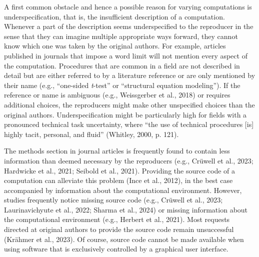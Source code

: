 \documentclass[authordate, empirical]{jote-new-article}
\begin{document}
	A first common obstacle and hence a possible reason for varying computations is underspecification, that is, the insufficient description of a computation. Whenever a part of the description seems underspecified to the reproducer in the sense that they can imagine multiple appropriate ways forward, they cannot know which one was taken by the original authors. For example, articles published in journals that impose a word limit will not mention every aspect of the computation. Procedures that are common in a field are not described in detail but are either referred to by a literature reference or are only mentioned by their name (e.g., “one-sided \emph{t}-test” or “structural equation modeling”). If the reference or name is ambiguous (e.g., Weissgerber et al., 2018) or requires additional choices, the reproducers might make other unspecified choices than the original authors. Underspecification might be particularly high for fields with a pronounced technical task uncertainty, where “the use of technical procedures [is] highly tacit, personal, and fluid” (Whitley, 2000, p. 121).



	The methods section in journal articles is frequently found to contain less information than deemed necessary by the reproducers (e.g., Crüwell et al., 2023; Hardwicke et al., 2021; Seibold et al., 2021). Providing the source code of a computation can alleviate this problem (Ince et al., 2012), in the best case accompanied by information about the computational environment. However, studies frequently notice missing source code (e.g., Crüwell et al., 2023; Laurinavichyute et al., 2022; Sharma et al., 2024) or missing information about the computational environment (e.g., Herbert et al., 2021). Most requests directed at original authors to provide the source code remain unsuccessful (Krähmer et al., 2023). Of course, source code cannot be made available when using software that is exclusively controlled by a graphical user interface.
\end{document}
